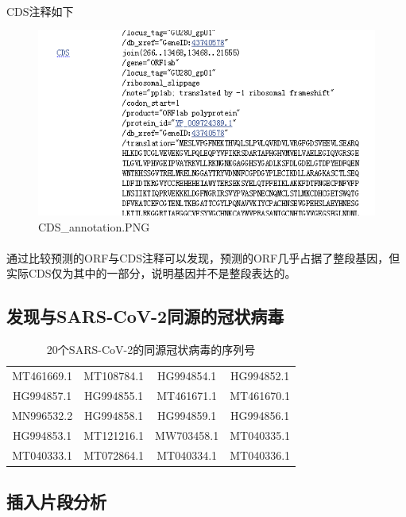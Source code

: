 \documentclass[supercite]{HustGraduPaper}
\begin{document}
	\paragraph{}\label{subpara:subpara}CDS注释如下
	\begin{figure}[H]
		\centering
		\includegraphics[width=1\textwidth]{./material/practice1/CDS.png}
		\caption{CDS\_annotation.PNG}
	\end{figure}
	\paragraph{}\label{subpara:subpara}通过比较预测的ORF与CDS注释可以发现，预测的ORF几乎占据了整段基因，但实际CDS仅为其中的一部分，说明基因并不是整段表达的。
  \subsection{发现与SARS-CoV-2同源的冠状病毒}
	\begin{table}[H]
		\begin{center}
			\begin{tabular}{|cccc|}
				\hline
				MT461669.1 & MT108784.1 & HG994854.1 & HG994852.1 \\
				HG994857.1 & HG994855.1 & MT461671.1 & MT461670.1 \\
        MN996532.2 & HG994858.1 & HG994859.1 &
        HG994856.1 \\
				HG994853.1 & MT121216.1 & MW703458.1 & MT040335.1 \\
				MT040333.1 & MT072864.1 & MT040334.1 & MT040336.1 \\ \hline
			\end{tabular}
			\caption{20个SARS-CoV-2的同源冠状病毒的序列号}
		\end{center}
	\end{table}
  \subsection{插入片段分析}
\end{document}
